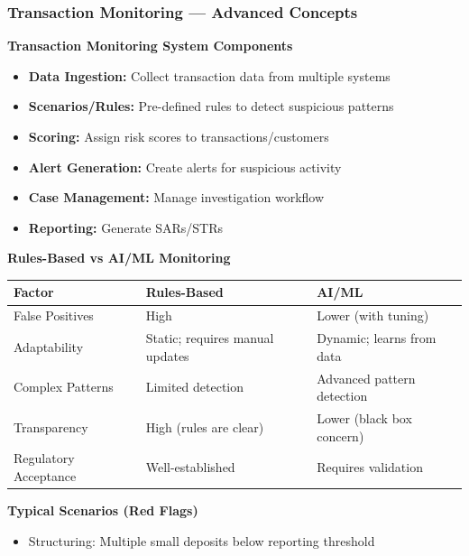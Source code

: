 \documentclass[12pt,aspectratio=169]{beamer}
\renewcommand{\scriptsize}{\fontsize{4.5}{5.5}\selectfont}
\newcommand{\keypoint}[1]{\textcolor{deepblue}{\textbf{#1}}}
\begin{document}
	\begin{frame}
		\frametitle{\fontsize{11}{13}\selectfont \textbf{Transaction Monitoring — Advanced Concepts}}
		\begin{block}{\fontsize{7}{9}\selectfont \textbf{Transaction Monitoring System Components}}
			\scriptsize
			\begin{itemize}
				\item \textbf{Data Ingestion:} Collect transaction data from multiple systems
				\item \textbf{Scenarios/Rules:} Pre-defined rules to detect suspicious patterns
				\item \textbf{Scoring:} Assign risk scores to transactions/customers
				\item \textbf{Alert Generation:} Create alerts for suspicious activity
				\item \textbf{Case Management:} Manage investigation workflow
				\item \textbf{Reporting:} Generate SARs/STRs
			\end{itemize}
		\end{block}
		\vspace{0.02cm}
		\begin{block}{\fontsize{7}{9}\selectfont \textbf{Rules-Based vs AI/ML Monitoring}}
			\scriptsize
			\begin{tabular}{|p{}|p{}|p{0.34\textwidth}|}
				\hline
				\keypoint{Factor} & \keypoint{Rules-Based} & \keypoint{AI/ML} \\
				\hline
				False Positives & High & Lower (with tuning) \\
				\hline
				Adaptability & Static; requires manual updates & Dynamic; learns from data \\
				\hline
				Complex Patterns & Limited detection & Advanced pattern detection \\
				\hline
				Transparency & High (rules are clear) & Lower (black box concern) \\
				\hline
				Regulatory Acceptance & Well-established & Requires validation \\
				\hline
			\end{tabular}
		\end{block}
		\vspace{0.02cm}
		\begin{block}{\fontsize{7}{9}\selectfont \textbf{Typical Scenarios (Red Flags)}}
			\scriptsize
			\begin{itemize}
				\item Structuring: Multiple small deposits below reporting threshold

\end{itemize}
\end{block}
\end{frame}
\end{document}
